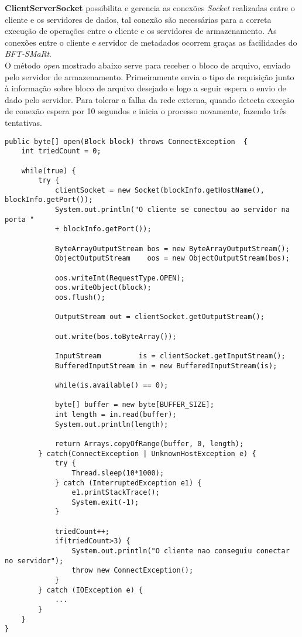 \textbf{ClientServerSocket} possibilita e gerencia as conexões \textit{Socket} realizadas entre o cliente e os servidores de dados, tal conexão são necessárias para a correta execução de operações entre o cliente e os servidores de armazenamento. As conexões entre o cliente e servidor de metadados ocorrem graças as facilidades do \textit{BFT-SMaRt}.
\\

O método \textit{open} mostrado abaixo serve para receber o bloco de arquivo, enviado pelo servidor de armazenamento.
Primeiramente envia o tipo de requisição junto à informação sobre bloco de arquivo desejado e logo a seguir espera o envio de dado pelo servidor.
Para tolerar a falha da rede externa, quando detecta exceção de conexão espera por 10 segundos e inicia o processo novamente, fazendo três tentativas.

\begin{lstlisting}[basicstyle=\ttfamily\footnotesize, frame=single]	
public byte[] open(Block block) throws ConnectException  {
	int triedCount = 0;
	
	while(true) {
		try {
			clientSocket = new Socket(blockInfo.getHostName(), blockInfo.getPort());
			System.out.println("O cliente se conectou ao servidor na porta " 
			+ blockInfo.getPort());
			
			ByteArrayOutputStream bos = new ByteArrayOutputStream();
			ObjectOutputStream    oos = new ObjectOutputStream(bos);
			
			oos.writeInt(RequestType.OPEN);
			oos.writeObject(block);
			oos.flush();
			
			OutputStream out = clientSocket.getOutputStream();
			
			out.write(bos.toByteArray());
		
			InputStream         is = clientSocket.getInputStream();
			BufferedInputStream in = new BufferedInputStream(is);
			
			while(is.available() == 0);
			
			byte[] buffer = new byte[BUFFER_SIZE];
			int length = in.read(buffer);
			System.out.println(length);
		
			return Arrays.copyOfRange(buffer, 0, length);
		} catch(ConnectException | UnknownHostException e) {
			try {
				Thread.sleep(10*1000);
			} catch (InterruptedException e1) {
				e1.printStackTrace();
				System.exit(-1);
			}
			
			triedCount++;
			if(triedCount>3) {
				System.out.println("O cliente nao conseguiu conectar no servidor");
				throw new ConnectException();
			}
		} catch (IOException e) {
			...
		}
	}
}
\end{lstlisting}

